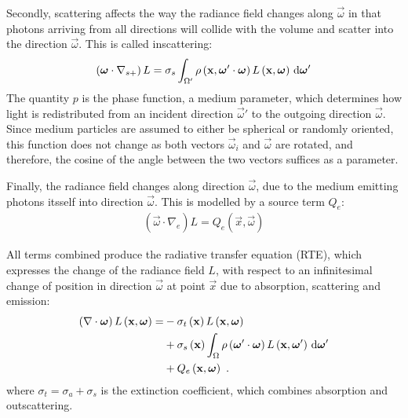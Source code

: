 Secondly, scattering affects the way the radiance field changes along $\vec{\omega}$ in that photons arriving from all directions will collide with the volume and scatter into the direction $\vec{\omega}$. This is called inscattering:
\begin{align}
\left(\boldsymbol{\mathbf{\omega}}\cdot\nabla_{s+}\right)L = \sigma_s \int_{\Omega'}\rho\left(\boldsymbol{\mathbf{x}}, \boldsymbol{\mathbf{\omega}}'\cdot\boldsymbol{\mathbf{\omega}}\right)L\left(\boldsymbol{\mathbf{x}}, \boldsymbol{\mathbf{\omega}} \right)\,\mathrm{d}\boldsymbol{\mathbf{\omega}}'
\label{eq:rte_inscattering}
\end{align}
The quantity $p$ is the phase function, a medium parameter, which determines how light is redistributed from an incident direction $\vec{\omega}'$ to the outgoing direction $\vec{\omega}$. Since medium particles are assumed to either be spherical or randomly oriented, this function does not change as both vectors $\vec{\omega}_i$ and $\vec{\omega}$ are rotated, and therefore, the cosine of the angle between the two vectors suffices as a parameter.


Finally, the radiance field changes along direction $\vec{\omega}$, due to the medium emitting photons itsself into direction $\vec{\omega}$. This is modelled by a source term $Q_e$:
\begin{align}
\left(\vec{\omega}\cdot\nabla_{e}\right)L = Q_e\left(\vec{x}, \vec{\omega}\right)
\end{align}

All terms combined produce the radiative transfer equation (RTE), which expresses the change of the radiance field $L$, with respect to an infinitesimal change of position in direction $\vec{\omega}$ at point $\vec{x}$ due to absorption, scattering and emission:
\begin{align}
\left(\nabla\cdot\boldsymbol{\mathbf{\omega}}\right)L\left(\boldsymbol{\mathbf{x}}, \boldsymbol{\mathbf{\omega}} \right)
=&
-\sigma_t\left(\boldsymbol{\mathbf{x}}\right) L\left(\boldsymbol{\mathbf{x}}, \boldsymbol{\mathbf{\omega}} \right)\nonumber\\
&
+\sigma_s\left(\boldsymbol{\mathbf{x}}\right) \int_{\Omega}
{
\rho\left(\boldsymbol{\mathbf{\omega}}'\cdot\boldsymbol{\mathbf{\omega}}\right)L\left(\boldsymbol{\mathbf{x}}, \boldsymbol{\mathbf{\omega}}' \right)\,\mathrm{d}\boldsymbol{\mathbf{\omega}}'
}
\label{eq:rte}
\\
&
+Q_e\left(\boldsymbol{\mathbf{x}}, \boldsymbol{\mathbf{\omega}}\right)
\nonumber
\  .
\end{align}
where $\sigma_t=\sigma_a+\sigma_s$ is the extinction coefficient, which combines absorption and outscattering.

